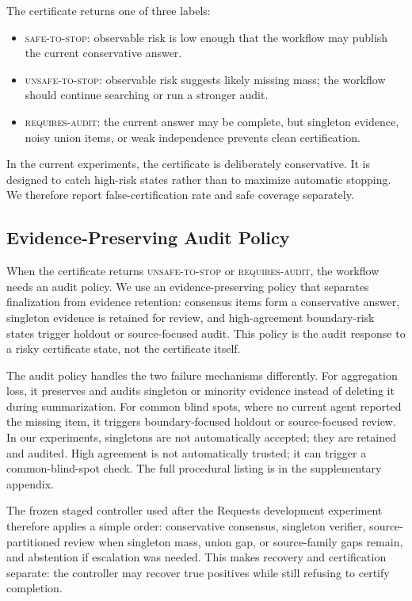 \documentclass[letterpaper]{article}
\begin{document}
The certificate returns one of three labels:

\begin{itemize}
    \item \textsc{safe-to-stop}: observable risk is low enough that the workflow
    may publish the current conservative answer.
    \item \textsc{unsafe-to-stop}: observable risk suggests likely missing
    mass; the workflow should continue searching or run a stronger audit.
    \item \textsc{requires-audit}: the current answer may be complete, but
    singleton evidence, noisy union items, or weak independence prevents clean
    certification.
\end{itemize}

In the current experiments, the certificate is deliberately conservative. It is
designed to catch high-risk states rather than to maximize automatic stopping.
We therefore report false-certification rate and safe coverage separately.

\subsection{Evidence-Preserving Audit Policy}

When the certificate returns \textsc{unsafe-to-stop} or
\textsc{requires-audit}, the workflow needs an audit policy. We use an
evidence-preserving policy that separates finalization from evidence retention:
consensus items form a conservative answer, singleton evidence is retained for
review, and high-agreement boundary-risk states trigger holdout or source-focused
audit. This policy is the audit response to a risky certificate state, not the
certificate itself.

The audit policy handles the two failure mechanisms differently. For aggregation
loss, it preserves and audits singleton or minority evidence instead of deleting
it during summarization. For common blind spots, where no current agent reported
the missing item, it triggers boundary-focused holdout or source-focused review.
In our experiments, singletons are not automatically accepted; they are retained
and audited. High agreement is not automatically trusted; it can trigger a
common-blind-spot check. The full procedural listing is in the supplementary
appendix.

The frozen staged controller used after the Requests development experiment
therefore applies a simple order: conservative consensus, singleton verifier,
source-partitioned review when singleton mass, union gap, or source-family gaps
remain, and abstention if escalation was needed. This makes recovery and
certification separate: the controller may recover true positives while still
refusing to certify completion.
\end{document}
